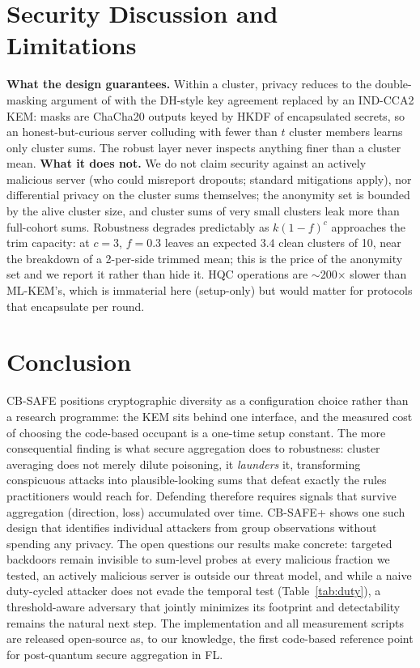 \documentclass[lettersize,journal]{IEEEtran}
\begin{document}
\section{Security Discussion and Limitations}
\textbf{What the design guarantees.} Within a cluster, privacy reduces to the
double-masking argument of \cite{bonawitz2017} with the DH-style key agreement
replaced by an IND-CCA2 KEM: masks are ChaCha20 outputs keyed by HKDF of
encapsulated secrets, so an honest-but-curious server colluding with fewer than $t$
cluster members learns only cluster sums. The robust layer never inspects anything
finer than a cluster mean. \textbf{What it does not.} We do not claim security
against an actively malicious server (who could misreport dropouts; standard
mitigations apply), nor differential privacy on the cluster sums themselves; the
anonymity set is bounded by the alive cluster size, and cluster sums of very small
clusters leak more than full-cohort sums. Robustness degrades predictably as
$k(1-f)^c$ approaches the trim capacity: at $c{=}3$, $f{=}0.3$ leaves an expected
$3.4$ clean clusters of 10, near the breakdown of a 2-per-side trimmed mean; this
is the price of the anonymity set and we report it rather than hide it. HQC
operations are $\sim$200$\times$ slower than ML-KEM's, which is immaterial here
(setup-only) but would matter for protocols that encapsulate per round.

\section{Conclusion}
CB-SAFE positions cryptographic diversity as a configuration choice rather than a
research programme: the KEM sits behind one interface, and the measured cost of
choosing the code-based occupant is a one-time setup constant. The more consequential
finding is what secure aggregation does to robustness: cluster averaging does not
merely dilute poisoning, it \emph{launders} it, transforming conspicuous attacks
into plausible-looking sums that defeat exactly the rules practitioners would reach
for. Defending therefore requires signals that survive aggregation (direction,
loss) accumulated over time. CB-SAFE+ shows one such design that identifies
individual attackers from group observations without spending any privacy. The open
questions our results make concrete: targeted backdoors remain invisible to
sum-level probes at every malicious fraction we tested, an actively malicious server
is outside our threat model, and while a naive duty-cycled attacker does not evade
the temporal test (Table~\ref{tab:duty}), a threshold-aware adversary that jointly
minimizes its footprint and detectability remains the natural next step. The implementation and all measurement scripts are
released open-source as, to our knowledge, the first code-based reference point for
post-quantum secure aggregation in FL.
\end{document}

